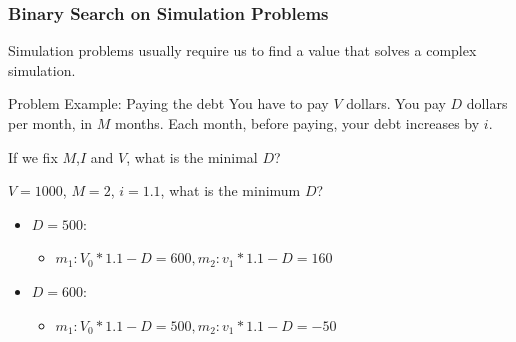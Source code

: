 

\begin{frame}
  \frametitle{Binary Search on Simulation Problems}

  Simulation problems usually require us to find a value that solves
  a complex simulation.

  \begin{block}{Problem Example: Paying the debt}
    You have to pay $V$ dollars. You pay $D$ dollars per month, in $M$
    months. Each month, before paying, your debt increases by $i$.

    \medskip

    If we fix $M$,$I$ and $V$, what is the minimal $D$?
  \end{block}

  \bigskip

  $V = 1000$, $M = 2$, $i = 1.1$, what is the minimum $D$?

  \begin{itemize}
  \item $D = 500$:
    \begin{itemize}
    \item $m_1: V_0 *1.1 - D = 600, m_2: v_1*1.1 - D = 160$
    \end{itemize}
  \item $D = 600$:
    \begin{itemize}
    \item $m_1: V_0 *1.1 - D = 500, m_2: v_1*1.1 - D = -50$
    \end{itemize}
  \end{itemize}
\end{frame}

